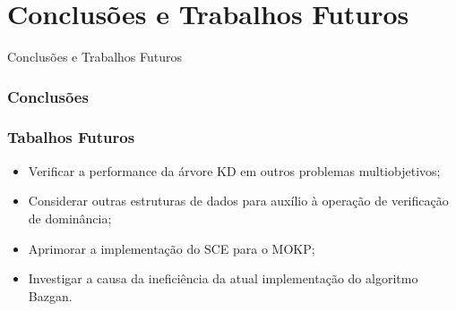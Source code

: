 \documentclass[10pt,xcolor=table,fleqn]{beamer}
\newcommand{\mytitle}[1]{
  \begin{center}
    \color{defblue}
    { \LARGE #1 }
  \end{center}
}
\begin{document}
\section{Conclusões e Trabalhos Futuros}

\begin{frame}
	\mytitle{Conclusões e Trabalhos Futuros}
\end{frame}

\begin{frame}
	\frametitle{Conclusões}
\end{frame}

\begin{frame}
	\frametitle{Tabalhos Futuros}
  \begin{itemize}
    \item{ Verificar a performance da árvore KD em outros problemas
      multiobjetivos;}
    \item{ Considerar outras estruturas de dados
      para auxílio à operação de verificação de dominância;}
    \item{ Aprimorar a implementação do SCE para o MOKP;}
    \item{ Investigar a causa da ineficiência da atual implementação
      do algoritmo Bazgan.}
  \end{itemize}
\end{frame}
\end{document}
